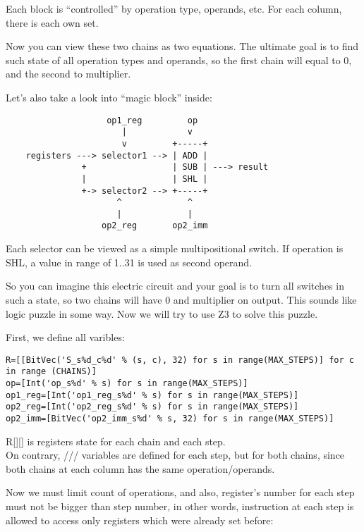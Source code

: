 Each block is ``controlled'' by operation type, operands, etc.
For each column, there is each own set.

Now you can view these two chains as two equations.
The ultimate goal is to find such state of all operation types and operands, so the first chain will equal to 0,
and the second to multiplier.

Let's also take a look into ``magic block'' inside:

\begin{lstlisting}
	                op1_reg         op
	                   |            v
	                   v         +-----+
	registers ---> selector1 --> | ADD |
	           +                 | SUB | ---> result
	           |                 | SHL |
	           +-> selector2 --> +-----+
	                  ^             ^
	                  |             |
	               op2_reg       op2_imm
\end{lstlisting}

Each selector can be viewed as a simple multipositional switch.
If operation is SHL, a value in range of 1..31 is used as second operand.

So you can imagine this electric circuit and your goal is to turn all switches in such a state, so two chains
will have 0 and multiplier on output.
This sounds like logic puzzle in some way.
Now we will try to use Z3 to solve this puzzle.

First, we define all varibles:

\begin{lstlisting}
R=[[BitVec('S_s%d_c%d' % (s, c), 32) for s in range(MAX_STEPS)] for c in range (CHAINS)]
op=[Int('op_s%d' % s) for s in range(MAX_STEPS)]
op1_reg=[Int('op1_reg_s%d' % s) for s in range(MAX_STEPS)]
op2_reg=[Int('op2_reg_s%d' % s) for s in range(MAX_STEPS)]
op2_imm=[BitVec('op2_imm_s%d' % s, 32) for s in range(MAX_STEPS)]
\end{lstlisting}

R[][] is registers state for each chain and each step.\\
On contrary, /// variables are defined for each step, but for both chains,
since both chains at each column has the same operation/operands.

Now we must limit count of operations, and also, register's number for each step must not be bigger than step number,
in other words, instruction at each step is allowed to access only registers which were already set before:


